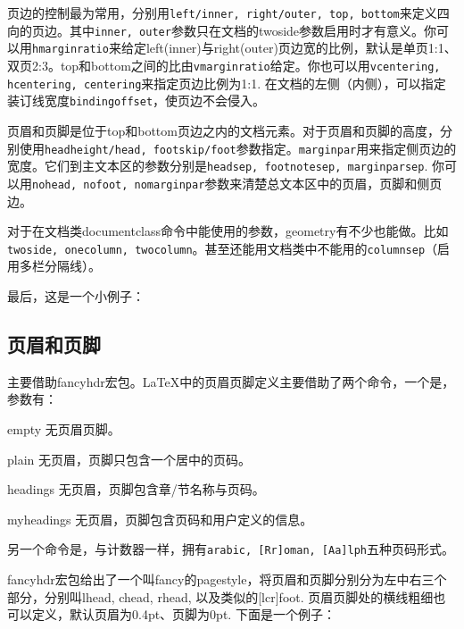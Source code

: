 {页边的控制最为常用，分别用\texttt{left/inner, right/outer, top, bottom}来定义四向的页边。其中\texttt{inner, outer}参数只在文档的twoside参数启用时才有意义。你可以用\texttt{hmarginratio}来给定left(inner)与right(outer)页边宽的比例，默认是单页1:1、双页2:3。top和bottom之间的比由\texttt{vmarginratio}给定。你也可以用\texttt{vcentering, hcentering, centering}来指定页边比例为1:1. 在文档的左侧（内侧），可以指定装订线宽度\texttt{bindingoffset}，使页边不会侵入。

页眉和页脚是位于top和bottom页边之内的文档元素。对于页眉和页脚的高度，分别使用\texttt{headheight/head, footskip/foot}参数指定。\texttt{marginpar}用来指定侧页边的宽度。它们到主文本区的参数分别是\texttt{headsep, footnotesep, marginparsep}. 你可以用\texttt{nohead, nofoot, nomarginpar}参数来清楚总文本区中的页眉，页脚和侧页边。

对于在文档类documentclass命令中能使用的参数，geometry有不少也能做。比如\texttt{twoside, onecolumn, twocolumn}。甚至还能用文档类中不能用的\texttt{columnsep}（启用多栏分隔线）。

最后，这是一个小例子：
\begin{latex}{}
\usepackage[marginpar=3cm, includemp]{package}
\end{latex}

\subsection{页眉和页脚}
主要借助fancyhdr宏包。\LaTeX 中的页眉页脚定义主要借助了两个命令，一个是\latexline{\\pagestyle}，参数有：
\begin{para}
\item[empty] 无页眉页脚。
\item[plain] 无页眉，页脚只包含一个居中的页码。
\item[headings] 无页眉，页脚包含章/节名称与页码。
\item[myheadings] 无页眉，页脚包含页码和用户定义的信息。
\end{para}

另一个命令是\latexline{\\pagenumbering}，与计数器一样，拥有\texttt{arabic, [Rr]oman, [Aa]lph}五种页码形式。

fancyhdr宏包给出了一个叫fancy的pagestyle，将页眉和页脚分别分为左中右三个部分，分别叫lhead, chead, rhead, 以及类似的[lcr]foot. 页眉页脚处的横线粗细也可以定义，默认页眉为0.4pt、页脚为0pt. 下面是一个例子：
\begin{latex}{}
\usepackage{fancyhdr}
\pagestyle{fancy}
  \lhead{}
  \chead{}
  \cfoot{\thepage}
\renewcommand{\headrulewidth}{0.4pt}
\renewcommand{\footrulewidth}{0.4pt}
\end{latex}

}
